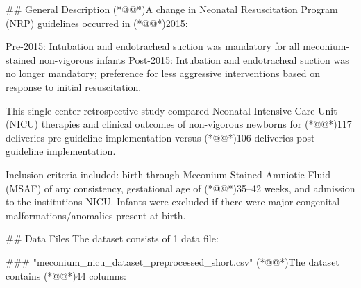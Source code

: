 \documentclass[11pt]{article}
\begin{document}
\begin{codeoutput}
\#\# General Description
(*@@*)A change in Neonatal Resuscitation Program (NRP) guidelines occurred in (*@@*)2015:

Pre-2015: Intubation and endotracheal suction was mandatory for all meconium-stained non-vigorous infants
Post-2015: Intubation and endotracheal suction was no longer mandatory; preference for less aggressive interventions based on response to initial resuscitation.

This single-center retrospective study compared Neonatal Intensive Care Unit (NICU) therapies and clinical outcomes of non-vigorous newborns for (*@@*)117 deliveries pre-guideline implementation versus (*@@*)106 deliveries post-guideline implementation.

Inclusion criteria included: birth through Meconium-Stained Amniotic Fluid (MSAF) of any consistency, gestational age of (*@@*)35--42 weeks, and admission to the institutions NICU. Infants were excluded if there were major congenital malformations/anomalies present at birth.

\#\# Data Files
The dataset consists of 1 data file:

\#\#\# "meconium\_nicu\_dataset\_preprocessed\_short.csv"
(*@@*)The dataset contains (*@@*)44 columns:


\end{codeoutput}
\end{document}
